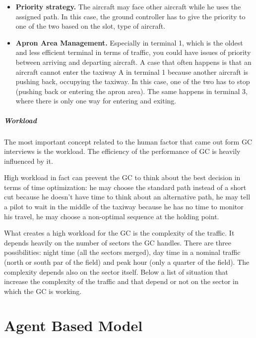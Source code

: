 \documentclass{article}
\begin{document}
\begin{itemize}
\item \textbf{Priority strategy.}
The aircraft may face other aircraft while he uses the assigned path. In this case, the ground controller has to give the priority to one of the two based on the slot, type of aircraft.

\item \textbf{Apron Area Management.}
Especially in terminal 1, which is the oldest and less efficient terminal in terms of traffic, you could have issues of priority between arriving and departing aircraft. A case that often happens is that an aircraft cannot enter the taxiway A in terminal 1 because another aircraft is pushing back, occupying the taxiway. In this case, one of the two has to stop (pushing back or entering the apron area). The same happens in terminal 3, where there is only one way for entering and exiting. 

\end{itemize}

\subsubsection*{Workload}
The most important concept related to the human factor that came out form GC interviews is the workload. The efficiency of the performance of GC is heavily influenced by it.

High workload in fact can prevent the GC to think about the best decision in terms of time optimization: he may choose the standard path instead of a short cut because he doesn't have time to think about an alternative path, he may tell a pilot to wait in the middle of the taxiway because he has no time to monitor his travel, he may choose a non-optimal sequence at the holding point.

What creates a high workload for the GC is the complexity of the traffic.
It depends heavily on the number of sectors the GC handles. There are three possibilities: night time (all the sectors merged), day time in a nominal traffic (north or south par of the field) and peak hour (only a quarter of the field). The complexity depends also on the sector itself. Below a list of situation that increase the complexity of the traffic and that depend or not on the sector in which the GC is working.



\newpage
\part{Agent Based Model}
\end{document}
